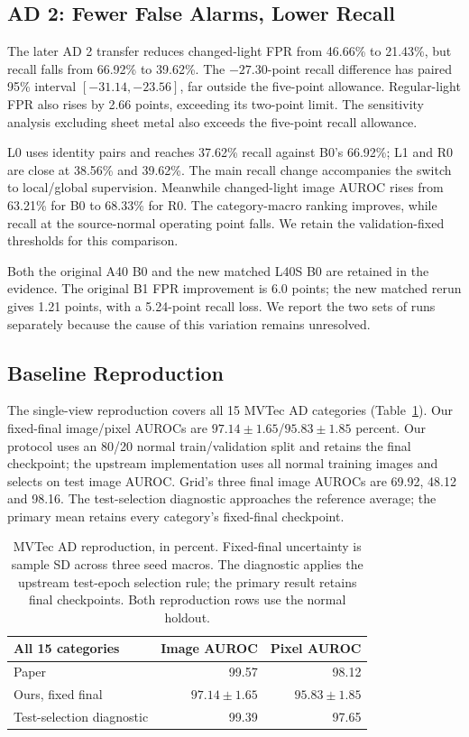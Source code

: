 \documentclass[letterpaper]{article}
\begin{document}
\subsection{AD 2: Fewer False Alarms, Lower Recall}

The later AD 2 transfer reduces changed-light FPR from 46.66\% to 21.43\%, but recall falls
from 66.92\% to 39.62\%. The $-27.30$-point recall difference has paired 95\% interval
$[-31.14,-23.56]$, far outside the five-point allowance. Regular-light FPR also rises by
2.66 points, exceeding its two-point limit. The sensitivity analysis excluding sheet metal
also exceeds the five-point recall allowance.

L0 uses identity pairs and reaches 37.62\% recall against B0's 66.92\%; L1 and R0 are close
at 38.56\% and 39.62\%. The main recall change accompanies the switch to local/global
supervision. Meanwhile changed-light image AUROC rises from 63.21\% for B0 to 68.33\% for
R0. The category-macro ranking improves, while recall at the source-normal operating point
falls. We retain the validation-fixed thresholds for this comparison.

Both the original A40 B0 and the new matched L40S B0 are retained in the evidence. The
original B1 FPR improvement is 6.0 points; the new matched rerun gives 1.21 points, with a
5.24-point recall loss. We report the two sets of runs separately because the cause of this
variation remains unresolved.

\subsection{Baseline Reproduction}

The single-view reproduction covers all 15 MVTec AD categories
(Table~\ref{tab:reproduction}). Our fixed-final image/pixel AUROCs are
$97.14\pm1.65$/$95.83\pm1.85$ percent. Our protocol uses an 80/20 normal train/validation
split and retains the final checkpoint; the upstream implementation uses all normal training
images and selects on test image AUROC. Grid's three final image AUROCs are 69.92, 48.12 and
98.16. The test-selection diagnostic approaches the reference average; the primary mean
retains every category's fixed-final checkpoint.

\begin{table}[t]
\centering\small
\begin{tabular}{lrr}
\toprule
All 15 categories & Image AUROC & Pixel AUROC\\
\midrule
Paper & 99.57 & 98.12\\
Ours, fixed final & $97.14\pm1.65$ & $95.83\pm1.85$\\
Test-selection diagnostic & 99.39 & 97.65\\
\bottomrule
\end{tabular}
\caption{MVTec AD reproduction, in percent. Fixed-final uncertainty is sample SD across three seed macros. The diagnostic applies the upstream test-epoch selection rule; the primary result retains final checkpoints. Both reproduction rows use the normal holdout.}
\label{tab:reproduction}
\end{table}
\end{document}
